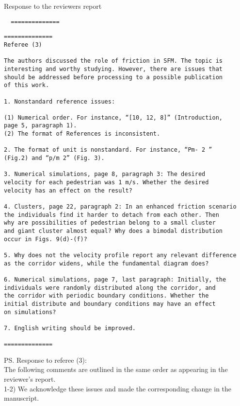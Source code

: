 \documentclass[a4paper,12pt]{letter}
\begin{document}
\begin{letter}{Response to the reviewers report}
{\begin{verbatim}
  ==============
\end{verbatim}

}

\newpage

\begin{verbatim}
==============
Referee (3)

The authors discussed the role of friction in SFM. The topic is 
interesting and worthy studying. However, there are issues that 
should be addressed before processing to a possible publication 
of this work.

1. Nonstandard reference issues:

(1) Numerical order. For instance, “[10, 12, 8]” (Introduction,
page 5, paragraph 1).
(2) The format of References is inconsistent.

2. The format of unit is nonstandard. For instance, “Pm- 2 ” 
(Fig.2) and “p/m 2” (Fig. 3).

3. Numerical simulations, page 8, paragraph 3: The desired 
velocity for each pedestrian was 1 m/s. Whether the desired 
velocity has an effect on the result?

4. Clusters, page 22, paragraph 2: In an enhanced friction scenario 
the individuals find it harder to detach from each other. Then 
why are possibilities of pedestrian belong to a small cluster 
and giant cluster almost equal? Why does a bimodal distribution 
occur in Figs. 9(d)-(f)?

5. Why does not the velocity profile report any relevant difference 
as the corridor widens, while the fundamental diagram does?

6. Numerical simulations, page 7, last paragraph: Initially, the 
individuals were randomly distributed along the corridor, and 
the corridor with periodic boundary conditions. Whether the 
initial distribute and boundary conditions may have an effect 
on simulations?

7. English writing should be improved.

==============

\end{verbatim}


\ps{Response to referee (3): \\

The following comments are outlined in the same order as appearing in the
reviewer’s report. \\

1-2) We acknowledge these issues and made the corresponding change in the 
manuscript.\\

}
\end{letter}
\end{document}
